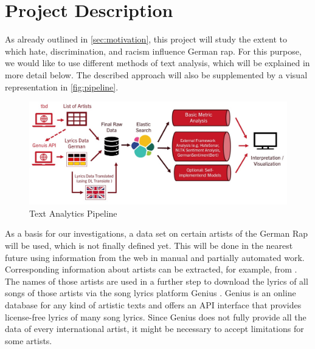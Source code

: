 \section{Project Description}\label{sec:project}

As already outlined in \autoref{sec:motivation}, this project will study the extent to which hate, discrimination, and racism influence German rap. For this purpose, we would like to use different methods of text analysis, which will be explained in more detail below. The described approach will also be supplemented by a visual representation in \autoref{fig:pipeline}.

\begin{figure}[!htb]
  \centering
  \includegraphics[width=\textwidth]{figures/pipeline.jpg}
  \caption[]{Text Analytics Pipeline}
  \label{fig:pipeline}
  \end{figure}

As a basis for our investigations, a data set on certain artists of the German Rap will be used, which is not finally defined yet. This will be done in the nearest future using information from the web in manual and partially automated work. Corresponding information about artists can be extracted, for example, from \cite{last.fm,tonspion_2021}. The names of those artists are used in a further step to download the lyrics of all songs of those artists via the song lyrics platform Genius \cite{genius}. Genius is an online database for any kind of artistic texts and offers an API interface that provides license-free lyrics of many song lyrics. Since Genius does not fully provide all the data of every international artist, it might be necessary to accept limitations for some artists.

